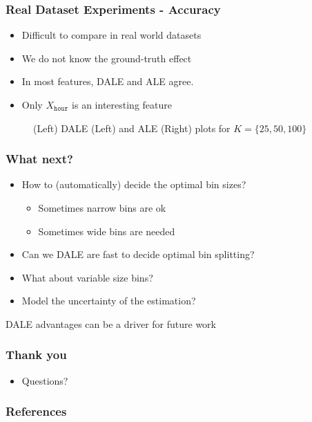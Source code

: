 \documentclass{beamer}
\begin{document}
\begin{frame}
  \frametitle{Real Dataset Experiments - Accuracy}
  \begin{itemize}
  \item Difficult to compare in real world datasets
   \item We do not know the ground-truth effect
   \item In most features, DALE and ALE agree.
   \item Only \(X_{\mathtt{hour}}\) is an interesting feature
  \end{itemize}

  \begin{figure}[h]
  \centering
    \resizebox{.3\columnwidth}{!}{}
    \resizebox{.3\columnwidth}{!}{}
    \caption{(Left) DALE (Left) and ALE (Right) plots for
      \(K = \{25, 50, 100\}\)}
\end{figure}

\end{frame}

\begin{frame}
  \frametitle{What next?}
  \begin{itemize}
  \item How to (automatically) decide the optimal bin sizes?
    \begin{itemize}
      \item Sometimes narrow bins are ok
      \item Sometimes wide bins are needed
      \end{itemize}
    \item Can we DALE are fast to decide optimal bin splitting?
    \item What about variable size bins?
      \item Model the uncertainty of the estimation?
  \end{itemize}

  \noindent\makebox[\linewidth]{\rule{\paperwidth}{0.4pt}}
  DALE advantages can be a driver for future work
\end{frame}


\begin{frame}
  \frametitle{Thank you}
  \begin{itemize}
  \item Questions?
  \end{itemize}

\end{frame}



\begin{frame}[allowframebreaks]
  \frametitle{References}
  \printbibliography
\end{frame}
\end{document}
